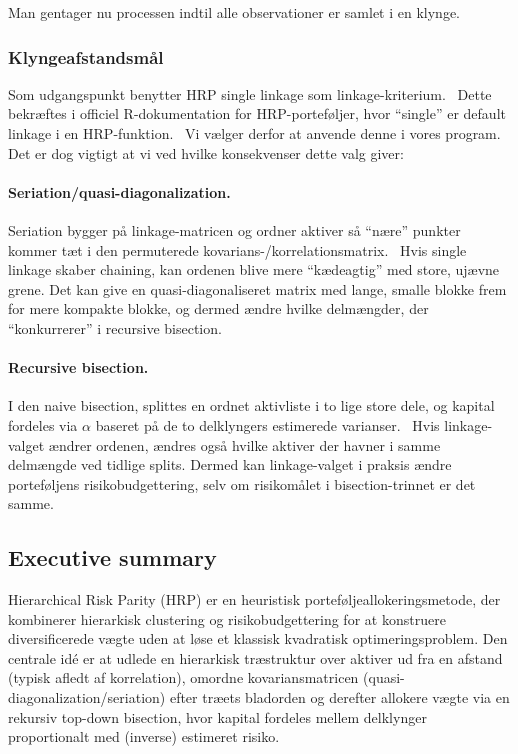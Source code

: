 \documentclass[../main.tex]{subfiles}
\begin{document}
Man gentager nu processen indtil alle observationer er samlet i en klynge.

\subsubsection{Klyngeafstandsmål}

Som udgangspunkt benytter HRP single linkage som linkage-kriterium.~\cite{kaae_karppinen_hierarchical_2022} Dette bekræftes i officiel R-dokumentation for HRP-porteføljer, hvor ``single'' er default linkage i en HRP-funktion.~\cite{trucios_hrp_portfolio_nodate} Vi vælger derfor at anvende denne i vores program. Det er dog vigtigt at vi ved hvilke konsekvenser dette valg giver:

\paragraph{Seriation/quasi-diagonalization.}
Seriation bygger på linkage-matricen og ordner aktiver så ``nære'' punkter kommer tæt i den permuterede kovarians-/korrelationsmatrix.~\cite{kaae_karppinen_hierarchical_2022} Hvis single linkage skaber chaining, kan ordenen blive mere ``kædeagtig'' med store, ujævne grene. Det kan give en quasi-diagonaliseret matrix med lange, smalle blokke frem for mere kompakte blokke, og dermed ændre hvilke delmængder, der ``konkurrerer'' i recursive bisection.

\paragraph{Recursive bisection.}
I den naive bisection, splittes en ordnet aktivliste i to lige store dele, og kapital fordeles via $\alpha$ baseret på de to delklyngers estimerede varianser.~\cite{kaae_karppinen_hierarchical_2022} Hvis linkage-valget ændrer ordenen, ændres også hvilke aktiver der havner i samme delmængde ved tidlige splits. Dermed kan linkage-valget i praksis ændre porteføljens risikobudgettering, selv om risikomålet i bisection-trinnet er det samme.

\subsection{Executive summary}

Hierarchical Risk Parity (HRP) er en heuristisk porteføljeallokeringsmetode, der kombinerer hierarkisk clustering og risikobudgettering for at konstruere diversificerede vægte uden at løse et klassisk kvadratisk optimeringsproblem. Den centrale idé er at udlede en hierarkisk træstruktur over aktiver ud fra en afstand (typisk afledt af korrelation), omordne kovariansmatricen (quasi-diagonalization/seriation) efter træets bladorden og derefter allokere vægte via en rekursiv top-down bisection, hvor kapital fordeles mellem delklynger proportionalt med (inverse) estimeret risiko.~\cite{lopez_de_prado_building_2016,kaae_karppinen_hierarchical_2022}
\end{document}
